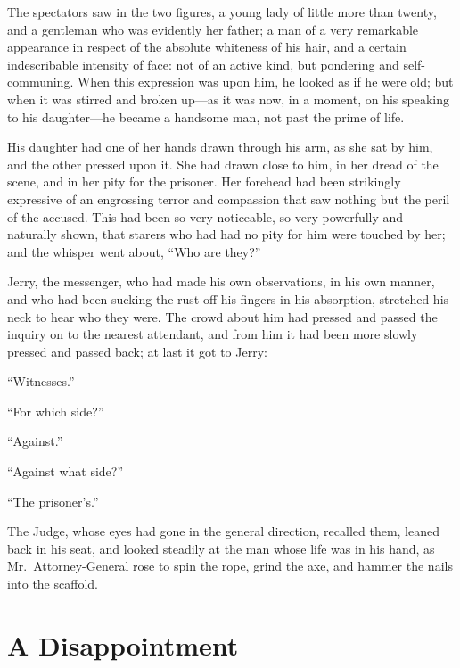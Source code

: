 The spectators saw in the two figures, a young lady of little more
than twenty, and a gentleman who was evidently her father; a man of
a very remarkable appearance in respect of the absolute whiteness
of his hair, and a certain indescribable intensity of face:  not of
an active kind, but pondering and self-communing.  When this expression
was upon him, he looked as if he were old; but when it was stirred
and broken up---as it was now, in a moment, on his speaking to his
daughter---he became a handsome man, not past the prime of life.

His daughter had one of her hands drawn through his arm, as she sat
by him, and the other pressed upon it.  She had drawn close to him,
in her dread of the scene, and in her pity for the prisoner.  Her
forehead had been strikingly expressive of an engrossing terror and
compassion that saw nothing but the peril of the accused.  This had
been so very noticeable, so very powerfully and naturally shown, that
starers who had had no pity for him were touched by her; and the
whisper went about, ``Who are they?''

Jerry, the messenger, who had made his own observations, in his own
manner, and who had been sucking the rust off his fingers in his
absorption, stretched his neck to hear who they were.  The crowd
about him had pressed and passed the inquiry on to the nearest
attendant, and from him it had been more slowly pressed and passed
back; at last it got to Jerry:

``Witnesses.''

``For which side?''

``Against.''

``Against what side?''

``The prisoner's.''

The Judge, whose eyes had gone in the general direction, recalled
them, leaned back in his seat, and looked steadily at the man whose
life was in his hand, as Mr.\ Attorney-General rose to spin the rope,
grind the axe, and hammer the nails into the scaffold.



\chapter{A Disappointment}


